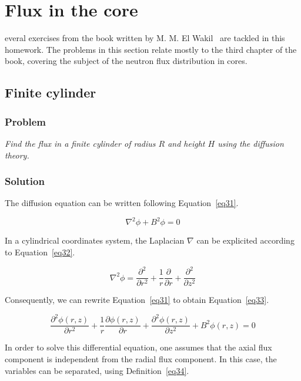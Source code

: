 %
%
\let\textcircled=\pgftextcircled
\chapter{Flux in the core}
\label{chap:intro}

everal exercises from the book written by M. M. El Wakil~\cite{book01} are tackled in this homework. The problems in this section relate mostly to the third chapter of the book, covering the subject of the neutron flux distribution in cores.

\section{Finite cylinder}
\label{prob31}

\subsection{Problem}
\textit{Find the flux in a finite cylinder of radius $R$ and height $H$ using the diffusion theory.}

\subsection{Solution}

The diffusion equation can be written following Equation~\ref{eq31}.

\begin{equation}\label{eq31}
\nabla^2 \phi + B^2\phi = 0
\end{equation}

In a cylindrical coordinates system, the Laplacian $\nabla$ can be explicited according to Equation~\ref{eq32}.

\begin{equation}\label{eq32}
\nabla^2 \phi = \frac{\partial^2}{\partial r^2} + \frac{1}{r}\frac{\partial}{\partial r} + \frac{\partial^2}{\partial z^2}
\end{equation}

Consequently, we can rewrite Equation~\ref{eq31} to obtain Equation~\ref{eq33}.


\begin{equation}\label{eq33}
\frac{\partial^2 \phi(r, z)}{\partial r^2} + \frac{1}{r}\frac{\partial \phi(r, z)}{\partial r} + \frac{\partial^2 \phi(r, z)}{\partial z^2} + B^2\phi(r, z) = 0
\end{equation}

In order to solve this differential equation, one assumes that the axial flux component is independent from the radial flux component. In this case, the variables can be separated, using Definition~\ref{eq34}.


